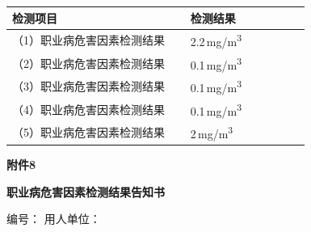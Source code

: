 \documentclass[UTF8,10pt,a4paper,fontset=fandol]{ctexart}
\newcommand{\fieldvalue}[1]{#1}
\newcommand{\handwritten}[1]{#1}
\begin{document}
\begin{tabular}{|p{0.55\linewidth}|p{0.37\linewidth}|}
\hline
检测项目 & 检测结果 \\
\hline
（1）职业病危害因素检测结果
&
\fieldvalue{\handwritten{2.2\,mg/m\textsuperscript{3}}}
\\
\hline
（2）职业病危害因素检测结果
&
\fieldvalue{\handwritten{0.1\,mg/m\textsuperscript{3}}}
\\
\hline
（3）职业病危害因素检测结果
&
\fieldvalue{\handwritten{0.1\,mg/m\textsuperscript{3}}}
\\
\hline
（4）职业病危害因素检测结果
&
\fieldvalue{\handwritten{0.1\,mg/m\textsuperscript{3}}}
\\
\hline
（5）职业病危害因素检测结果
&
\fieldvalue{\handwritten{2\,mg/m\textsuperscript{3}}}
\\
\hline
\end{tabular}


\newpage

\begin{center}
\textbf{附件8}

\vspace{0.5em}
\textbf{职业病危害因素检测结果告知书}
\end{center}

\noindent
编号：\underline{\hspace{4cm}}
\hfill
用人单位：\underline{\hspace{4cm}}

\vspace{0.5em}
\end{document}
